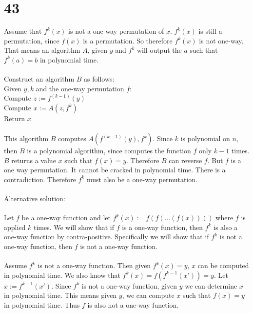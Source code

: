 \documentclass[letterpaper,notitlepage,twoside]{article}
\newcommand\tab[1][1cm]{\hspace*{#1}} %
\begin{document}
\section*{43}
Assume that $f^k(x)$ is not a one-way permutation of $x$. $f^k(x)$ is still a permutation, since $f(x)$ is a permutation. So therefore $f^k(x)$ is not one-way. That means an algorithm $A$, given $y$ and $f^k$ will output the $a$ such that $f^k(a) = b$ in polynomial time. \\\\
Construct an algorithm $B$ as follows: \\
Given $y, k$ and the one-way permutation $f$: \\
\tab Compute $z := f^{(k - 1)}(y)$ \\
\tab Compute $x := A(z, f^k)$ \\
\tab Return $x$\\\\
This algorithm $B$ computes $A(f^{(k - 1)}(y), f^k)$. Since $k$ is polynomial on $n$, then $B$ is a polynomial algorithm, since computes the function $f$ only $k - 1$ times. $B$ returns a value $x$ such that $f(x) = y$. Therefore $B$ can reverse $f$. But $f$ is a one way permutation. It cannot be cracked in polynomial time. There is a contradiction. Therefore $f^k$ must also be a one-way permutation.
\\\\
Alternative solution:
\\\\
Let $f$ be a one-way function and let $f^k(x) := f(f(...(f(x))))$ where $f$ is applied $k$ times. We will show that if $f$ is a one-way function, then $f^k$ is also a one-way function by contra-positive. Specifically we will show that if $f^k$ is not a one-way function, then $f$ is not a one-way function.
\\\\
Assume $f^k$ is not a one-way function. Then given $f^k(x) = y$, $x$ can be computed in polynomial time. We also know that $ f^k(x) = f(f^{k-1}(x')) = y$. Let $x := f^{k-1}(x')$. Since $f^k$ is not a one-way function, given $y$ we can determine $x$ in polynomial time. This means given $y$, we can compute $x$ such that $f(x) = y$ in polynomial time. Thus $f$ is also not a one-way function.
\end{document}
